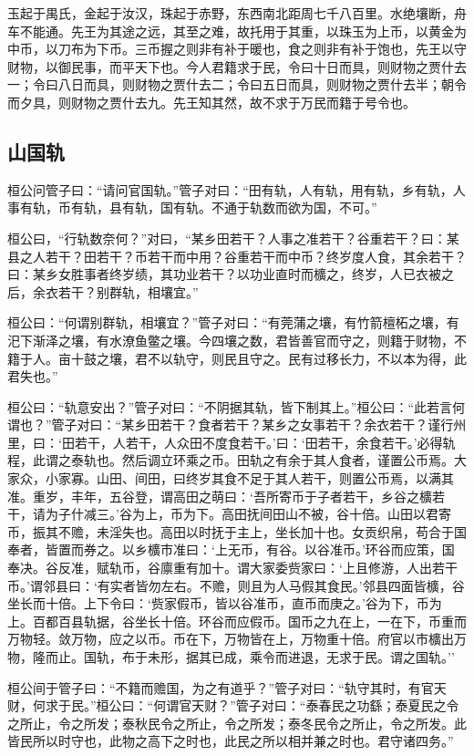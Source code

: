 \documentclass[]{article}
\begin{document}
玉起于禺氏，金起于汝汉，珠起于赤野，东西南北距周七千八百里。水绝壤断，舟车不能通。先王为其途之远，其至之难，故托用于其重，以珠玉为上币，以黄金为中币，以刀布为下币。三币握之则非有补于暖也，食之则非有补于饱也，先王以守财物，以御民事，而平天下也。今人君籍求于民，令曰十日而具，则财物之贾什去一；令曰八日而具，则财物之贾什去二；令曰五日而具，则财物之贾什去半；朝令而夕具，则财物之贾什去九。先王知其然，故不求于万民而籍于号令也。

\hypertarget{header-n985}{%
\subsection{山国轨}\label{header-n985}}

桓公问管子曰：``请问官国轨。''管子对曰：``田有轨，人有轨，用有轨，乡有轨，人事有轨，币有轨，县有轨，国有轨。不通于轨数而欲为国，不可。''

桓公曰，``行轨数奈何？''对曰，``某乡田若干？人事之准若干？谷重若干？曰：某县之人若干？田若干？币若干而中用？谷重若干而中币？终岁度人食，其余若干？曰：某乡女胜事者终岁绩，其功业若干？以功业直时而櫎之，终岁，人已衣被之后，余衣若干？别群轨，相壤宜。''

桓公曰：``何谓别群轨，相壤宜？''管子对曰：``有莞蒲之壤，有竹箭檀柘之壤，有汜下渐泽之壤，有水潦鱼鳖之壤。今四壤之数，君皆善官而守之，则籍于财物，不籍于人。亩十鼓之壤，君不以轨守，则民且守之。民有过移长力，不以本为得，此君失也。''

桓公曰：``轨意安出？''管子对曰：``不阴据其轨，皆下制其上。''桓公曰：``此若言何谓也？''管子对曰：``某乡田若干？食者若干？某乡之女事若干？余衣若干？谨行州里，曰：`田若干，人若干，人众田不度食若干。'曰：`田若干，余食若干。'必得轨程，此谓之泰轨也。然后调立环乘之币。田轨之有余于其人食者，谨置公币焉。大家众，小家寡。山田、间田，曰终岁其食不足于其人若干，则置公币焉，以满其准。重岁，丰年，五谷登，谓高田之萌曰：`吾所寄币于子者若干，乡谷之櫎若干，请为子什减三。'谷为上，币为下。高田抚间田山不被，谷十倍。山田以君寄币，振其不赡，未淫失也。高田以时抚于主上，坐长加十也。女贡织帛，苟合于国奉者，皆置而券之。以乡櫎市准曰：`上无币，有谷。以谷准币。'环谷而应策，国奉决。谷反准，赋轨币，谷廪重有加十。谓大家委赀家曰：`上且修游，人出若干币。'谓邻县曰：`有实者皆勿左右。不赡，则且为人马假其食民。'邻县四面皆櫎，谷坐长而十倍。上下令曰：`赀家假币，皆以谷准币，直币而庚之。'谷为下，币为上。百都百县轨据，谷坐长十倍。环谷而应假币。国币之九在上，一在下，币重而万物轻。敛万物，应之以币。币在下，万物皆在上，万物重十倍。府官以市櫎出万物，隆而止。国轨，布于未形，据其已成，乘令而进退，无求于民。谓之国轨。''

桓公间于管子曰：``不籍而赡国，为之有道乎？''管子对曰：``轨守其时，有官天财，何求于民。''桓公曰：``何谓官天财？''管子对曰：``泰春民之功繇；泰夏民之令之所止，令之所发；泰秋民令之所止，令之所发；泰冬民令之所止，令之所发。此皆民所以时守也，此物之高下之时也，此民之所以相并兼之时也。君守诸四务。''
\end{document}
